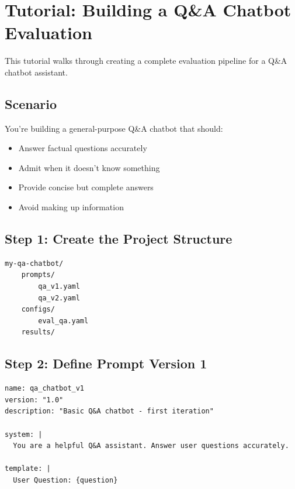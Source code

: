 \documentclass[11pt,a4paper]{report}
\begin{document}

\chapter{Tutorial: Building a Q\&A Chatbot Evaluation}

This tutorial walks through creating a complete evaluation pipeline for a Q\&A chatbot assistant.

\section{Scenario}

You're building a general-purpose Q\&A chatbot that should:
\begin{itemize}
    \item Answer factual questions accurately
    \item Admit when it doesn't know something
    \item Provide concise but complete answers
    \item Avoid making up information
\end{itemize}

\section{Step 1: Create the Project Structure}

\begin{lstlisting}
my-qa-chatbot/
    prompts/
        qa_v1.yaml
        qa_v2.yaml
    configs/
        eval_qa.yaml
    results/
\end{lstlisting}

\section{Step 2: Define Prompt Version 1}

\begin{lstlisting}[style=yaml,title={prompts/qa\_v1.yaml}]
name: qa_chatbot_v1
version: "1.0"
description: "Basic Q&A chatbot - first iteration"

system: |
  You are a helpful Q&A assistant. Answer user questions accurately.

template: |
  User Question: {question}
\end{lstlisting}
\end{document}
